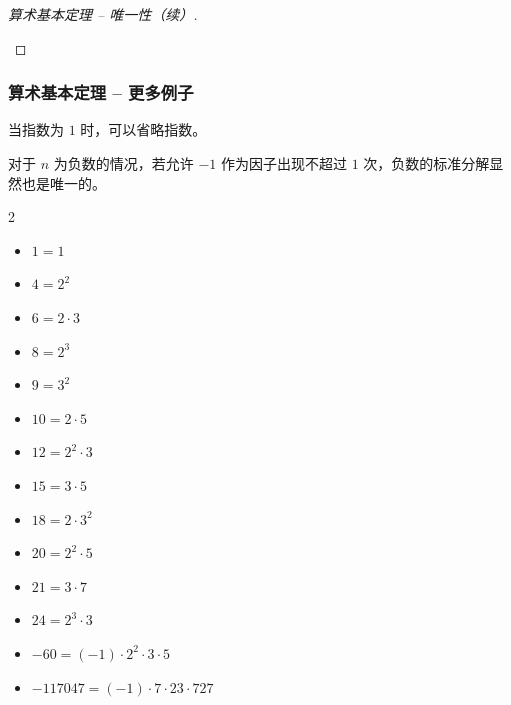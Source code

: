 \documentclass{../pkslide}
\begin{document}
\begin{frame}
{\begin{proof}[算术基本定理 -- 唯一性（续）]
\begin{itemize}
          
          
          
      \end{itemize}
      
    \end{proof}
  }
\end{frame}

\begin{frame}
  \frametitle{算术基本定理 -- 更多例子}
  
  当指数为 $1$ 时，可以省略指数。
  
  对于 $n$ 为负数的情况，若允许 $-1$ 作为因子出现不超过 $1$ 次，负数的标准分解显然也是唯一的。
  
  \begin{mymulticols}[l][l]{2}
    \begin{itemize}
      \item $1 = 1$
      \item $4 = 2^2$
      \item $6 = 2 \cdot 3$
      \item $8 = 2^3$
      \item $9 = 3^2$
      \item $10 = 2 \cdot 5$
      \item $12 = 2^2 \cdot 3$
      \item $15 = 3 \cdot 5$
      \item $18 = 2 \cdot 3^2$
      \item $20 = 2^2 \cdot 5$
      \item $21 = 3 \cdot 7$
      \item $24 = 2^3 \cdot 3$
      \item $-60 = (-1) \cdot 2^2 \cdot 3 \cdot 5$
      \item $-117047 = (-1) \cdot 7 \cdot 23 \cdot 727$
    \end{itemize}
  \end{mymulticols}
\end{frame}
\end{document}
